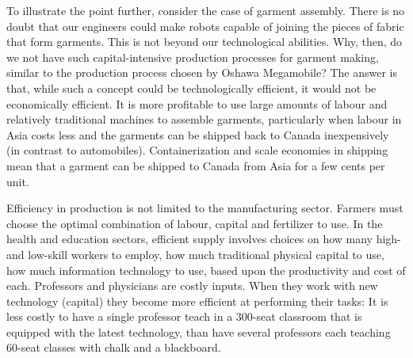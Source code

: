 \newhtmlpage

To illustrate the point further, consider the case of garment assembly.
There is no doubt that our engineers could make robots capable of joining
the pieces of fabric that form garments. This is not beyond our
technological abilities. Why, then, do we not have such capital-intensive
production processes for garment making, similar to the production process
chosen by Oshawa Megamobile? The answer is that, while such a concept could
be technologically efficient, it would not be economically efficient. It is
more profitable to use large amounts of labour and relatively traditional
machines to assemble garments, particularly when labour in Asia costs less and
the garments can be shipped back to Canada inexpensively (in contrast to
automobiles). Containerization and scale economies in shipping mean that a
garment can be shipped to Canada from Asia for a few cents per unit.

Efficiency in production is not limited to the manufacturing sector. Farmers
must choose the optimal combination of labour, capital and fertilizer to
use. In the health and education sectors, efficient supply involves choices
on how many high- and low-skill workers to employ, how much traditional
physical capital to use, how much information technology to use, based upon
the productivity and cost of each. Professors and physicians are costly
inputs. When they work with new technology (capital) they become more
efficient at performing their tasks: It is less costly to have a single
professor teach in a 300-seat classroom that is equipped with the latest
technology, than have several professors each teaching 60-seat classes with
chalk and a blackboard.